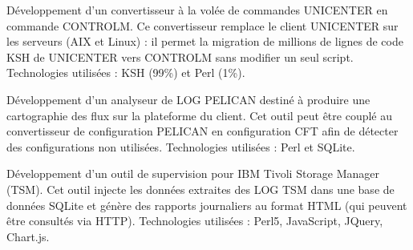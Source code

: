 \documentclass{cv}
\newlength{\interSectionTitleContentLength}
\newenvironment{sectionContent}{
   \vspace{\interSectionTitleContentLength}\par%
}{%
   \par%
}%
\newenvironment{realisationEnv}{
   \setlength{\parskip}{1em}
}{%
   \par%
}
\begin{document}
\begin{sectionContent}
\begin{realisationEnv}
         Développement d'un convertisseur à la volée de commandes UNICENTER en commande CONTROLM. Ce convertisseur remplace le client UNICENTER sur
         les serveurs (AIX et Linux) : il permet la migration de millions de lignes de code KSH de UNICENTER vers CONTROLM sans modifier un seul script.
         Technologies utilisées : KSH (99\%) et Perl (1\%).
   
         Développement d'un analyseur de LOG PELICAN destiné à produire une cartographie des flux sur la plateforme du client. Cet outil peut être
         couplé au convertisseur de configuration PELICAN en configuration CFT afin de détecter des configurations non utilisées. Technologies
         utilisées : Perl et SQLite.
   
         Développement d'un outil de supervision pour IBM Tivoli Storage Manager (TSM). Cet outil injecte les données extraites des LOG TSM dans une
         base de données SQLite et génère des rapports journaliers au format HTML (qui peuvent être consultés via HTTP). Technologies utilisées :
         Perl5, JavaScript, JQuery, Chart.js.
   
       \end{realisationEnv}
   \end{sectionContent}
\end{document}
